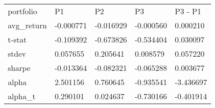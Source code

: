 \begin{tabular}{lllll}
\toprule
\midrule
portfolio & P1 & P2 & P3 & P3 - P1 \\
avg_return & -0.000771 & -0.016929 & -0.000560 & 0.000210 \\
t-stat & -0.109392 & -0.673826 & -0.534404 & 0.030097 \\
stdev & 0.057655 & 0.205641 & 0.008579 & 0.057220 \\
sharpe & -0.013364 & -0.082321 & -0.065288 & 0.003677 \\
alpha & 2.501156 & 0.760645 & -0.935541 & -3.436697 \\
alpha_t & 0.290101 & 0.024637 & -0.730166 & -0.401914 \\
\bottomrule
\end{tabular}
